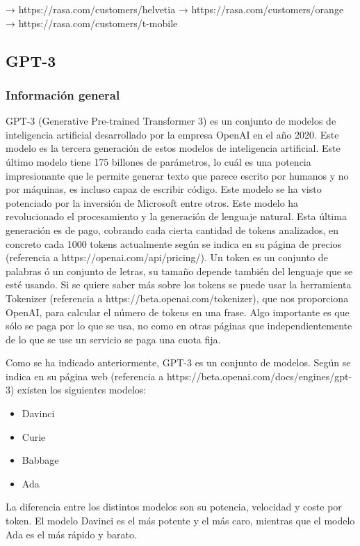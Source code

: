 → https://rasa.com/customers/helvetia
→ https://rasa.com/customers/orange
→ https://rasa.com/customers/t-mobile


\subsection{GPT-3}

\subsubsection*{Información general}

GPT-3 (Generative Pre-trained Transformer 3) es un conjunto de modelos de inteligencia artificial desarrollado por la empresa OpenAI en el año 2020. Este modelo es la tercera generación de estos modelos de inteligencia artificial. Este último modelo tiene 175 billones de parámetros, lo cuál es una potencia impresionante que le permite generar texto que parece escrito por humanos y no por máquinas, es incluso capaz de escribir código. Este modelo se ha visto potenciado por la inversión de Microsoft entre otros. Este modelo ha revolucionado el procesamiento y la generación de lenguaje natural. Esta última generación es de pago, cobrando cada cierta cantidad de tokens analizados, en concreto cada 1000 tokens actualmente según se indica en su página de precios (referencia a https://openai.com/api/pricing/). Un token es un conjunto de palabras ó un conjunto de letras, su tamaño depende también del lenguaje que se esté usando. Si se quiere saber más sobre los tokens se puede usar la herramienta Tokenizer (referencia a https://beta.openai.com/tokenizer), que nos proporciona OpenAI, para calcular el número de tokens en una frase. Algo importante es que sólo se paga por lo que se usa, no como en otras páginas que independientemente de lo que se use un servicio se paga una cuota fija.

Como se ha indicado anteriormente, GPT-3 es un conjunto de modelos. Según se indica en su página web (referencia a https://beta.openai.com/docs/engines/gpt-3) existen los siguientes modelos:

\begin{itemize}
    \item Davinci
    \item Curie
    \item Babbage
    \item Ada
\end{itemize}

La diferencia entre los distintos modelos son su potencia, velocidad y coste por token. El modelo Davinci es el más potente y el más caro, mientras que el modelo Ada es el más rápido y barato.

